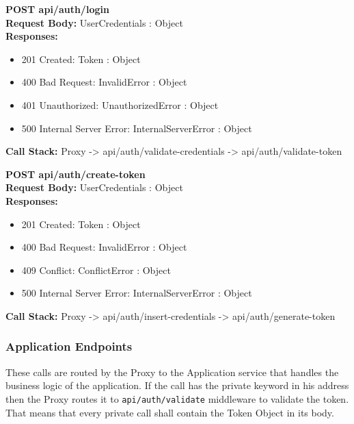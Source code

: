 \noindent\textbf{\color{titleColor}POST api/auth/login}
\vspace{2pt}
\\\textbf{\color{titleColor}Request Body:} UserCredentials : Object 
\vspace{4pt}
\\\textbf{\color{titleColor}Responses:} 
\begin{itemize}
    \item {\color{titleColor}201 Created:} Token : Object
    \item {\color{titleColor}400 Bad Request:} InvalidError : Object
    \item {\color{titleColor}401 Unauthorized:} UnauthorizedError : Object
    \item {\color{titleColor}500 Internal Server Error:} InternalServerError : Object
\end{itemize}
\textbf{\color{titleColor}Call Stack:} Proxy -> api/auth/validate-credentials -> api/auth/validate-token

\vspace{10pt}
\noindent{\color{titleColor}\rule{0.8\linewidth}{0.2mm}}
\vspace{10pt}

\noindent\textbf{\color{titleColor}POST api/auth/create-token}
\vspace{2pt}
\\\textbf{\color{titleColor}Request Body:} UserCredentials : Object 
\vspace{4pt}
\\\textbf{\color{titleColor}Responses:} 
\begin{itemize}
    \item {\color{titleColor}201 Created:} Token : Object
    \item {\color{titleColor}400 Bad Request:} InvalidError : Object
    \item {\color{titleColor}409 Conflict:} ConflictError : Object
    \item {\color{titleColor}500 Internal Server Error:} InternalServerError : Object
\end{itemize}
\textbf{\color{titleColor}Call Stack:} Proxy -> api/auth/insert-credentials -> api/auth/generate-token

\subsubsection*{Application Endpoints}\label{application-endpoints}

These calls are routed by the Proxy to the Application service that
handles the business logic of the application. If the call has the
private keyword in his address then the Proxy routes it to
\verb|api/auth/validate| middleware to validate the token. That means
that every private call shall contain the Token Object in its body.\\

